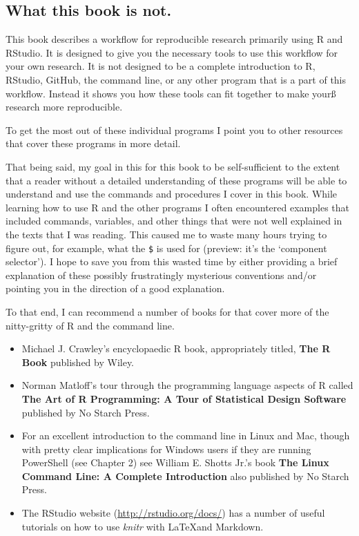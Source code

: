 \documentclass[ChapterTOCs,krantz1]{krantz}\usepackage{graphicx, color}
\begin{document}
\subsection{What this book is not.}\label{WhatNot}

This book describes a workflow for reproducible research primarily using R and RStudio. It is designed to give you the necessary tools to use this workflow for your own research. It is not designed to be a complete introduction to R, RStudio, GitHub, the command line, or any other program that is a part of this workflow. Instead it shows you how these tools can fit together to make yourß research more reproducible.

To get the most out of these individual programs I point you to other resources that cover these programs in more detail.

That being said, my goal in this for this book to be self-sufficient to the extent that a reader without a detailed understanding of these programs will be able to understand and use the commands and procedures
I cover in this book. While learning how to use R and the other programs I often encountered examples that included commands, variables, and other things that were not well explained in the texts that I was reading. This caused me to waste many hours trying to figure out, for example, what the \texttt{\$} is used for (preview: it's the `component selector'). I hope to save you from this wasted time by either providing a brief explanation of
these possibly frustratingly mysterious conventions and/or pointing you in the direction of a good explanation.

To that end, I can recommend a number of books for that cover more of the nitty-gritty of R and the command line.

\begin{itemize}
    \item Michael J. Crawley's encyclopaedic R book, appropriately   titled, \textbf{The R Book} published by Wiley.
    
    \item Norman Matloff's tour through the programming language aspects of  R called \textbf{The Art of R Programming: A Tour of Statistical Design Software} published by No Starch Press.
    
    \item For an excellent introduction to the command line in Linux and Mac, though with pretty clear implications for Windows users if they are running PowerShell (see Chapter 2) see William E. Shotts Jr.'s book \textbf{The Linux Command Line: A Complete Introduction} also published by No Starch Press.
    
    \item The RStudio website (\url{http://rstudio.org/docs/}) has a
  number of useful tutorials on how to use {\emph{knitr}} with \LaTeX and Markdown.
\end{itemize}
\end{document}
